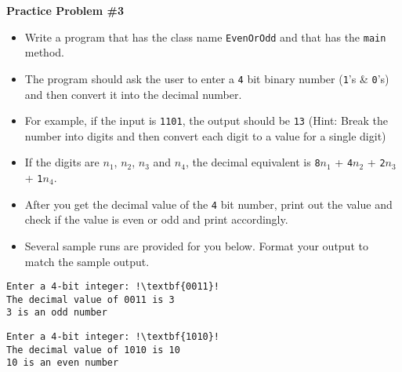 \documentclass[12pt]{article}
\begin{document}
\vspace*{0.5cm}
\noindent\textbf{Practice Problem \#3}
\begin{itemize}
	\item Write a program that has the class name \texttt{EvenOrOdd} and that has the \texttt{main} method.
	\item The program should ask the user to enter a \texttt{4} bit binary number (\texttt{1}'s \& \texttt{0}'s) and then convert it into the decimal number.
	\item For example, if the input is \texttt{1101}, the output should be \texttt{13} (Hint: Break the number into digits and then convert each digit to a value for a single digit)
	\item If the digits are \texttt{$n_1$}, \texttt{$n_2$}, \texttt{$n_3$} and \texttt{$n_4$}, the decimal equivalent is \texttt{8$n_1$} + \texttt{4$n_2$} + \texttt{2$n_3$} + \texttt{1$n_4$}.
	\item After you get the decimal value of the \texttt{4} bit number, print out the value and check if the value is even or odd and print accordingly.
	\item Several sample runs are provided for you below. Format your output to match the sample output.
\end{itemize}
\begin{center}
\begin{minipage}{5.25cm}
\begin{lstlisting}[escapechar=!]
Enter a 4-bit integer: !\textbf{0011}!
The decimal value of 0011 is 3
3 is an odd number
\end{lstlisting}
\end{minipage}
\hspace*{0.5cm}
\begin{minipage}{5.25cm}
\begin{lstlisting}[escapechar=!]
Enter a 4-bit integer: !\textbf{1010}!
The decimal value of 1010 is 10
10 is an even number
\end{lstlisting}
\end{minipage}
\hspace*{0.5cm}
\end{center}	
\end{document}
